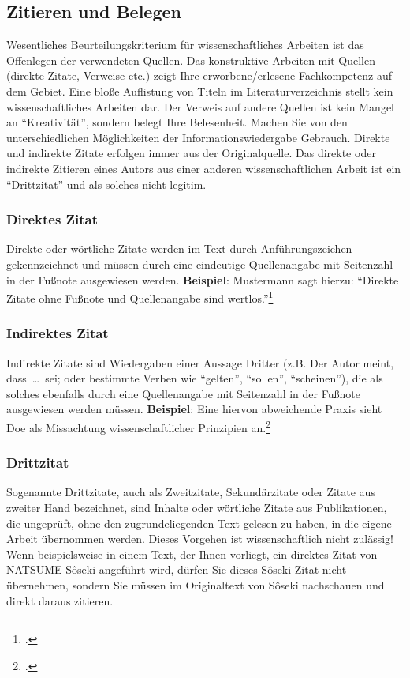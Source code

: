 \documentclass{japuzk}
\begin{document}
\subsection{Zitieren und Belegen}
Wesentliches Beurteilungskriterium für wissenschaftliches Arbeiten ist das Offenlegen der verwendeten Quellen. Das konstruktive Arbeiten mit Quellen (direkte Zitate, Verweise etc.) zeigt Ihre erworbene/erlesene Fachkompetenz auf dem Gebiet. Eine bloße Auflistung von Titeln im Literaturverzeichnis stellt kein wissenschaftliches Arbeiten dar. Der Verweis auf andere Quellen ist kein Mangel an \enquote{Kreativität}, sondern belegt Ihre Belesenheit. Machen Sie von den unterschiedlichen Möglichkeiten der Informationswiedergabe Gebrauch. Direkte und indirekte Zitate erfolgen immer aus der Originalquelle. Das direkte oder indirekte Zitieren eines Autors aus einer anderen wissenschaftlichen Arbeit ist ein \enquote{Drittzitat} und als solches nicht legitim.

\subsubsection{Direktes Zitat}
Direkte oder wörtliche Zitate werden im Text durch Anführungszeichen gekennzeichnet und müssen durch eine eindeutige Quellenangabe mit Seitenzahl in der Fußnote ausgewiesen werden.\newline
\textbf{Beispiel}: Mustermann sagt hierzu: \enquote{Direkte Zitate ohne Fußnote und Quellenangabe sind wertlos.}\footcite[12]{muster:quellen}

\subsubsection{Indirektes Zitat}
Indirekte Zitate sind Wiedergaben einer Aussage Dritter (z.B. Der Autor meint, dass~\ldots~sei; oder bestimmte Verben wie \enquote{gelten}, \enquote{sollen}, \enquote{scheinen}), die als solches ebenfalls durch eine Quellenangabe mit Seitenzahl in der Fußnote ausgewiesen werden müssen.\newline
\textbf{Beispiel}: Eine hiervon abweichende Praxis sieht Doe als Missachtung wissenschaftlicher Prinzipien an.\footcite[Vgl.][13\psq]{doe:references}

\subsubsection{Drittzitat}
Sogenannte Drittzitate, auch als Zweitzitate, Sekundärzitate oder Zitate aus zweiter Hand bezeichnet, sind Inhalte oder wörtliche Zitate aus Publikationen, die ungeprüft, ohne den zugrundeliegenden Text gelesen zu haben, in die eigene Arbeit übernommen werden. \underline{Dieses Vorgehen ist wissenschaftlich nicht zulässig!}\newline
Wenn beispielsweise in einem Text, der Ihnen vorliegt, ein direktes Zitat von NATSUME Sôseki angeführt wird, dürfen Sie dieses Sôseki-Zitat nicht übernehmen, sondern Sie müssen im Originaltext von Sôseki nachschauen und direkt daraus zitieren.
\end{document}
